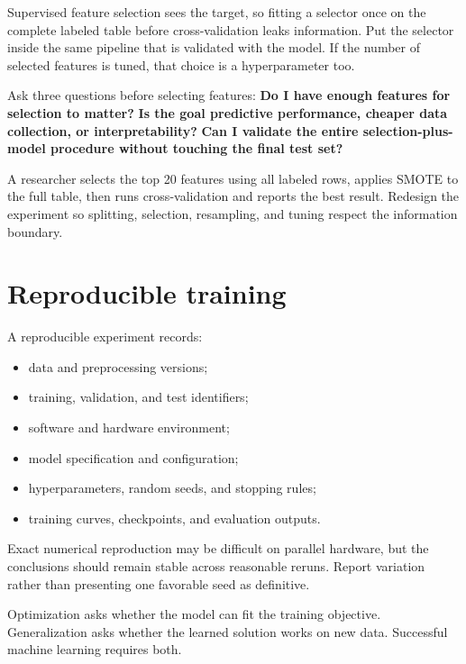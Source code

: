 \begin{pitfall}
Supervised feature selection sees the target, so fitting a selector once on the complete labeled table before cross-validation leaks information. Put the selector inside the same pipeline that is validated with the model. If the number of selected features is tuned, that choice is a hyperparameter too.
\end{pitfall}

\begin{keyidea}
Ask three questions before selecting features: \textbf{Do I have enough features for selection to matter?} \textbf{Is the goal predictive performance, cheaper data collection, or interpretability?} \textbf{Can I validate the entire selection-plus-model procedure without touching the final test set?}
\end{keyidea}

\begin{debugtask}
A researcher selects the top 20 features using all labeled rows, applies SMOTE to the full table, then runs cross-validation and reports the best result. Redesign the experiment so splitting, selection, resampling, and tuning respect the information boundary.
\end{debugtask}

\section{Reproducible training}

A reproducible experiment records:

\begin{itemize}
  \item data and preprocessing versions;
  \item training, validation, and test identifiers;
  \item software and hardware environment;
  \item model specification and configuration;
  \item hyperparameters, random seeds, and stopping rules;
  \item training curves, checkpoints, and evaluation outputs.
\end{itemize}

Exact numerical reproduction may be difficult on parallel hardware, but the conclusions should remain stable across reasonable reruns. Report variation rather than presenting one favorable seed as definitive.

\begin{keyidea}
Optimization asks whether the model can fit the training objective. Generalization asks whether the learned solution works on new data. Successful machine learning requires both.
\end{keyidea}

